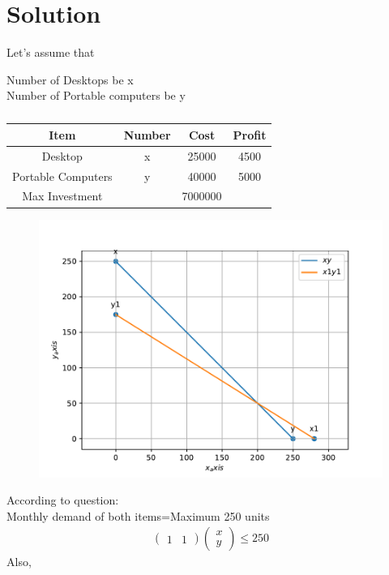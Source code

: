 \documentclass[10pt, a4paper]{article}
\newcommand{\myvec}[1]{\ensuremath{\begin{pmatrix}#1\end{pmatrix}}}
\begin{document}
\section{Solution}
Let's assume that
\begin{center}
Number of Desktops be x\\
Number of Portable computers be y\\
\fi
\begin{table}[!ht]
\centering
\begin{tabular}{|c|c|c|c|}
	\hline
	\textbf{Item}&\textbf{Number}&\textbf{Cost}&\textbf{Profit}\\
	\hline
	Desktop&x&25000&4500\\
	\hline
	Portable Computers&y&40000&5000\\
	\hline
	Max Investment& &7000000&\\
	\hline
\end{tabular}
\caption{}
		\label{table:12/12/2/8}
\end{table}
	\begin{figure}[!ht]
		\centering
		\includegraphics[width=\columnwidth]{12/12/2/8/figs/opti_1.pdf}
		\caption{}
		\label{fig:12/12/2/8}
  	\end{figure}
	\iffalse
According to question:\\
Monthly demand of both items=Maximum 250 units\\
\begin{align}
\myvec{1&1}\myvec{x\\y} \le 250 
\end{align}
Also,\\
\begin{center}

\end{center}
\end{center}
\end{document}
